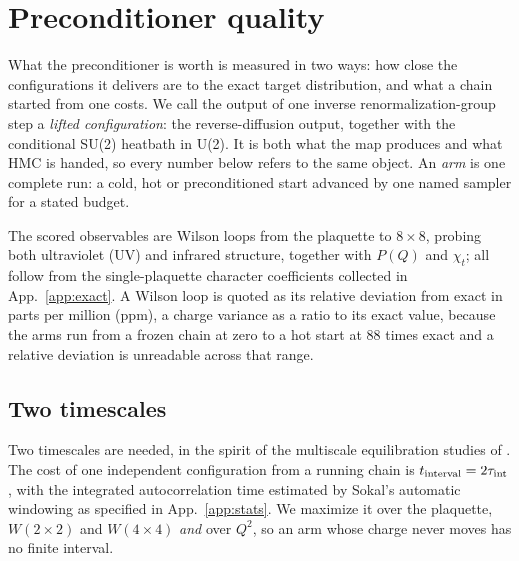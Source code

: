 \documentclass[prd, twocolumn, superscriptaddress, nofootinbib,floatfix]{revtex4-2}
\DeclareRobustCommand{\app}[1]{App.~\ref{app:#1}}
\begin{document}
\section{Preconditioner quality}
\label{sec:seedquality}
What the preconditioner is worth is measured in two ways: how close the
configurations it delivers are to the exact target distribution, and what a chain
started from one costs. We call the output of one inverse
renormalization-group step a \emph{lifted configuration}: the reverse-diffusion
output, together with the conditional SU(2) heatbath in U(2). It is both what
the map produces and what HMC is handed, so every number below refers to the
same object.
An \emph{arm} is one complete run: a cold, hot or preconditioned start advanced
by one named sampler for a stated budget. 

The scored observables are Wilson loops from the plaquette to $8\times8$,
probing both ultraviolet (UV) and infrared structure, together with $P(Q)$ and
$\chi_t$; all follow from the single-plaquette character coefficients collected
in \app{exact}. A Wilson loop is quoted as its relative deviation from exact in
parts per million (ppm), a charge variance as a ratio to its exact value,
because the arms run from a frozen chain at zero to a hot start at $88$ times
exact and a relative deviation is unreadable across that range.

\subsection{Two timescales}
\label{sec:relaxation-correction}
Two timescales are needed, in the spirit of the multiscale equilibration studies
of \cite{detmoldendres2015,detmoldendres2016}. The cost of one independent
configuration from a running chain is $t_{\rm interval}=2\tau_{\rm int}$, with
the integrated autocorrelation time estimated by Sokal's automatic windowing
\cite{madrassokal1988,wolff2004} as specified in \app{stats}. We maximize it
over the plaquette, $W(2\times2)$ and $W(4\times4)$ \emph{and} over $Q^2$, so an
arm whose charge never moves has no finite interval.
\end{document}
